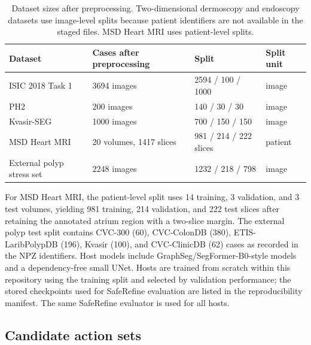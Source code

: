 \documentclass[preprint,12pt]{elsarticle}
\begin{document}
\begin{table}[t]
\centering
\small
\caption{Dataset sizes after preprocessing. Two-dimensional dermoscopy and
endoscopy datasets use image-level splits because patient identifiers are not
available in the staged files. MSD Heart MRI uses patient-level splits.}
\label{tab:dataset_protocol}
\begin{tabular}{llll}
\toprule
Dataset & Cases after preprocessing & Split & Split unit \\
\midrule
ISIC 2018 Task 1 & 3694 images & 2594 / 100 / 1000 & image \\
PH2 & 200 images & 140 / 30 / 30 & image \\
Kvasir-SEG & 1000 images & 700 / 150 / 150 & image \\
MSD Heart MRI & 20 volumes, 1417 slices & 981 / 214 / 222 slices & patient \\
External polyp stress set & 2248 images & 1232 / 218 / 798 & image \\
\bottomrule
\end{tabular}
\end{table}

For MSD Heart MRI, the patient-level split uses 14 training, 3 validation, and
3 test volumes, yielding 981 training, 214 validation, and 222 test slices
after retaining the annotated atrium region with a two-slice margin. The
external polyp test split contains CVC-300 (60), CVC-ColonDB (380),
ETIS-LaribPolypDB (196), Kvasir (100), and CVC-ClinicDB (62) cases as recorded
in the NPZ identifiers. Host models include GraphSeg/SegFormer-B0-style models
and a dependency-free small UNet. Hosts are trained from scratch within this
repository using the training split and selected by validation performance; the
stored checkpoints used for SafeRefine evaluation are listed in the
reproducibility manifest. The same SafeRefine evaluator is used for all hosts.

\subsection{Candidate action sets}
\end{document}
